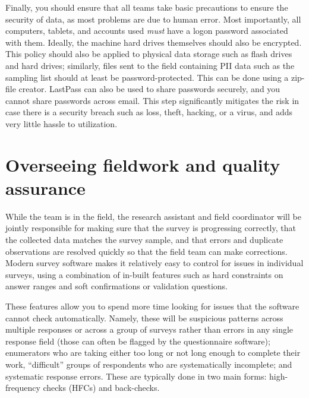 Finally, you should ensure that all teams take basic precautions
to ensure the security of data, as most problems are due to human error.
Most importantly, all computers, tablets, and accounts used
\textit{must} have a logon password associated with them.
Ideally, the machine hard drives themselves should also be encrypted.
This policy should also be applied to physical data storage
such as flash drives and hard drives;
similarly, files sent to the field containing PII data
such as the sampling list should at least be password-protected.
This can be done using a zip-file creator.
LastPass can also be used to share passwords securely,
and you cannot share passwords across email.
This step significantly mitigates the risk in case there is
a security breach such as loss, theft, hacking, or a virus,
and adds very little hassle to utilization.



\section{Overseeing fieldwork and quality assurance}

While the team is in the field, the research assistant
and field coordinator will be jointly responsible
for making sure that the survey is progressing correctly,
that the collected data matches the survey sample,
and that errors and duplicate observations are resolved
quickly so that the field team can make corrections.
Modern survey software makes it relatively easy
to control for issues in individual surveys,
using a combination of in-built features
such as hard constraints on answer ranges
and soft confirmations or validation questions.

These features allow you to spend more time
looking for issues that the software cannot check automatically.
Namely, these will be suspicious patterns across multiple responses
or across a group of surveys rather than errors in any single response field
(those can often be flagged by the questionnaire software);
enumerators who are taking either too long or not long enough to complete their work,
``difficult'' groups of respondents who are systematically incomplete; and
systematic response errors.
These are typically done in two main forms:
high-frequency checks (HFCs) and back-checks.

